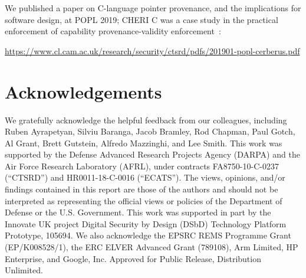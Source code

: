 \documentclass[12pt,twoside,openright,usletter]{article}
\begin{document}
\noindent
We published a paper on C-language pointer provenance, and the implications
for software design, at POPL 2019; CHERI C was a case study in the practical
enforcement of capability provenance-validity
enforcement~\cite{cerberus-popl2019}:

\smallskip
\noindent
\url{https://www.cl.cam.ac.uk/research/security/ctsrd/pdfs/201901-popl-cerberus.pdf}
\smallskip


\section{Acknowledgements}

We gratefully acknowledge the helpful feedback from our colleagues, including
Ruben Ayrapetyan, Silviu Baranga, Jacob Bramley, Rod Chapman, Paul Gotch, Al Grant,
Brett Gutstein, Alfredo Mazzinghi, and Lee Smith.
This work was supported by the Defense Advanced Research Projects Agency (DARPA) and the Air Force Research Laboratory (AFRL), under contracts
FA8750-10-C-0237 (``CTSRD'') and HR0011-18-C-0016 (``ECATS'').
The views, opinions, and/or findings contained in this report are those of the authors and should not be interpreted as representing the official views or policies of the Department of Defense or the U.S. Government.
This work was supported in part by the Innovate UK project Digital Security by
Design (DSbD) Technology Platform Prototype, 105694.
We also acknowledge the EPSRC REMS Programme Grant (EP/K008528/1), the
ERC ELVER Advanced Grant (789108), Arm Limited,
HP Enterprise, and Google, Inc.
Approved for Public Release, Distribution Unlimited.

\printbibliography
\end{document}
